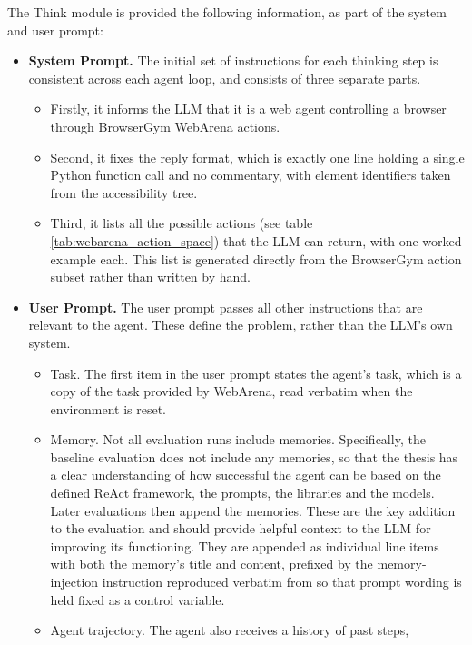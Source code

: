 \begin{itemize}
    The Think module is provided the following information, as part of the system
and user prompt:
\begin{itemize}
    \item \textbf{System Prompt.} The initial set of instructions for each
    thinking step is consistent across each agent loop, and consists of three
    separate parts.
    \begin{itemize}
        \item Firstly, it informs the LLM that it is a web agent controlling a
        browser through BrowserGym WebArena actions.
        \item Second, it fixes the reply format, which is exactly one line
        holding a single Python function call and no commentary, with element
        identifiers taken from the accessibility tree.
        \item Third, it lists all the possible actions (see table
        \ref{tab:webarena_action_space}) that the LLM can return, with one
        worked example each. This list is generated directly from the BrowserGym
        action subset rather than written by hand.
    \end{itemize}
    \item \textbf{User Prompt.} The user prompt passes all other instructions
    that are relevant to the agent. These define the problem, rather than the
    LLM's own system.
    \begin{itemize}
        \item Task. The first item in the user prompt states the agent's task, which is a copy of the task provided by WebArena, read verbatim when the
        environment is reset.
        \item Memory. Not all evaluation runs include memories. Specifically,
        the baseline evaluation does not include any memories, so that the
        thesis has a clear understanding of how successful the agent can be
        based on the defined ReAct framework, the prompts, the libraries and the
        models. Later evaluations then append the memories. These are the key
        addition to the evaluation and should provide helpful context to the LLM
        for improving its functioning. They are appended as individual line
        items with both the memory's title and content, prefixed by the
        memory-injection instruction reproduced verbatim from
        \citet{ouyang2025reasoningbank} so that prompt wording is held fixed as
        a control variable.
        \item Agent trajectory. The agent also receives a history of past steps,

\end{itemize}
\end{itemize}
\end{itemize}
